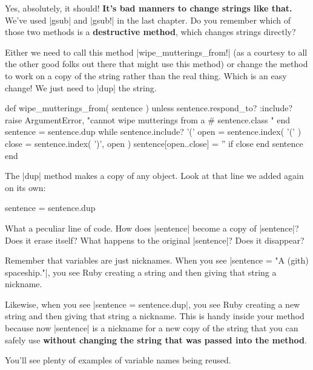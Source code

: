 \documentclass[12pt,twoside]{report}
\begin{document}
Yes, absolutely, it should!  {\bf It's bad manners to change strings
  like that.}  We've used \rubyinline|gsub| and
\rubyinline|gsub!| in the last chapter.  Do you
remember which of those two methods is a {\bf destructive method},
which changes strings directly?

Either we need to call this method
\rubyinline|wipe_mutterings_from!| (as a courtesy to
all the other good folks out there that might use this method) or
change the method to work on a copy of the string rather than the real
thing.  Which is an easy change!  We just need to
\rubyinline|dup| the string.


\begin{rubycode}

 def wipe_mutterings_from( sentence )
   unless sentence.respond_to? :include?
     raise ArgumentError,
       "cannot wipe mutterings from a #{ sentence.class }"
   end
   sentence = sentence.dup
   while sentence.include? '('
     open = sentence.index( '(' )
     close = sentence.index( ')', open )
     sentence[open..close] = '' if close
   end
   sentence
 end

\end{rubycode}


The \rubyinline|dup| method makes a copy of any
object.  Look at that line we added again on its own:


\begin{rubycode}

 sentence = sentence.dup

\end{rubycode}


What a peculiar line of code.  How does
\rubyinline|sentence| become a copy of
\rubyinline|sentence|? Does it erase itself?  What
happens to the original \rubyinline|sentence|?  Does
it disappear?

Remember that variables are just nicknames.  When you see
\rubyinline|sentence = "A (gith) spaceship."|, you see
Ruby creating a string and then giving that string a nickname.

Likewise, when you see \rubyinline|sentence = sentence.dup|, 
you see Ruby creating a new string and then giving that
string a nickname.  This is handy inside your method because now
\rubyinline|sentence| is a nickname for a new copy of
the string that you can safely use {\bf without changing the string
  that was passed into the method}.

You'll see plenty of examples of variable names being reused.
\end{document}
